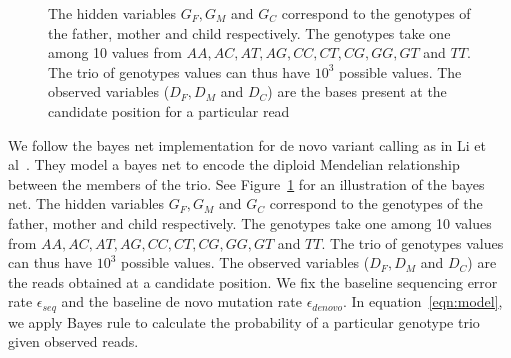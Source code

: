 \documentclass{article}
\begin{document}
\begin{figure}
\centering
{}
\caption{The hidden variables $G_{F}, G_{M}$ and $G_{C}$ correspond to the genotypes of the father, mother and child respectively. The genotypes take one among 10 values from $AA, AC, AT, AG, CC, CT, CG, GG, GT$ and $TT$. The trio of genotypes values can thus have $10^3$ possible values. The observed variables ($D_F, D_M$ and $D_C$) are the bases present at the candidate position for a particular read }
\label{fig:bayesnet}
\end{figure}

\vspace{5mm} 
We follow the bayes net implementation for de novo variant calling as in Li et al~\cite{Li2012}. They model a bayes net to encode the diploid Mendelian relationship between the members of the trio. See Figure~\ref{fig:bayesnet} for an illustration of the bayes net. The hidden variables $G_{F}, G_{M}$ and $G_{C}$ correspond to the genotypes of the father, mother and child respectively. The genotypes take one among 10 values from $AA, AC, AT, AG, CC, CT, CG, GG, GT$ and $TT$. The trio of genotypes values can thus have $10^3$ possible values. The observed variables ($D_F, D_M$ and $D_C$) are the reads obtained at a candidate position. We fix the baseline sequencing error rate $\epsilon_{seq}$ and the baseline de novo mutation rate $\epsilon_{denovo}$. In equation~\ref{eqn:model}, we apply Bayes rule to calculate the probability of a particular genotype trio given observed reads.
\end{document}
